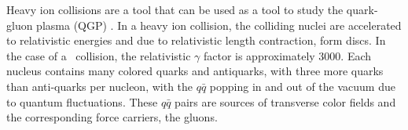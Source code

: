 
Heavy ion collisions are a tool that can be used as a tool to study the quark-gluon plasma (QGP) \cite{SHURYAK198071}.
In a heavy ion collision, the colliding nuclei are accelerated to relativistic energies and due to relativistic length contraction, form discs.
In the case of a \pbpb\ collision, the relativistic $\gamma$ factor is approximately 3000.
Each nucleus contains many colored quarks and antiquarks, with three more quarks than anti-quarks per nucleon, with the $q\bar{q}$ popping in and out of the vacuum due to quantum fluctuations.
These $q\bar{q}$ pairs are sources of transverse color fields and the corresponding force carriers, the gluons.

%

